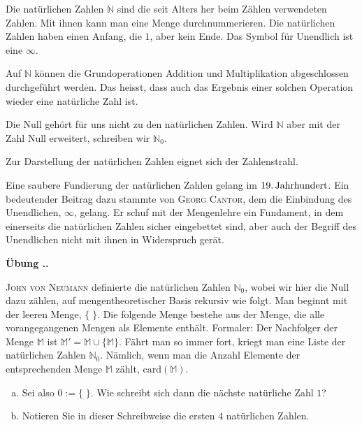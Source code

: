 \documentclass[%
11pt,%
twoside,%
titlepage,%
swissgerman,%
headsepline%
]{scrartcl}
\newcommand{\faEyeLightGray}{\textcolor{lightgray}{\faEye}} %
\newcommand{\definition}[1]{\colorbox{emerald}{#1}}
\theoremstyle{definition}
\theoremstyle{plain}
\newcommand{\concatueb}[1]{ueb:#1}%
\newcommand{\concatlsg}[1]{lsg:#1}%
\newcounter{uebcounter}[section]
\renewcommand{\theuebcounter}{\thesection.\arabic{uebcounter}}  %
\newenvironment{uebenv}[1]{%
    \refstepcounter{uebcounter}
    \par\noindent\textbf{Übung \theuebcounter.}%
    \label{\concatueb{#1}}\hfill\hyperref[\concatlsg{#1}]{\faEyeLightGray}\par
}{%
    \par
}
\begin{document}
Die natürlichen Zahlen $\mathbb{N}$ sind die seit Alters her beim Zählen verwendeten Zahlen.
Mit ihnen kann man eine Menge durchnummerieren. Die natürlichen Zahlen haben einen Anfang, die $1$, aber kein Ende. Das Symbol für Unendlich ist eine $\infty$.

Auf $\mathbb{N}$ können die Grundoperationen Addition und Multiplikation \definition{abgeschlossen} durchgeführt werden. Das heisst, dass auch das Ergebnis einer solchen Operation wieder eine natürliche Zahl ist.

Die Null gehört für uns nicht zu den natürlichen Zahlen. Wird $\mathbb{N}$ aber mit der Zahl Null erweitert, schreiben wir $\mathbb{N}_0$.

Zur Darstellung der natürlichen Zahlen eignet sich der \definition{Zahlenstrahl}.

\begin{center}
\end{center}

Eine saubere Fundierung der natürlichen Zahlen gelang im $\unit[19.]{Jahrhundert}$. Ein bedeutender Beitrag dazu stammte von \textsc{Georg Cantor}, dem die Einbindung des Unendlichen, $\infty$, gelang.
Er schuf mit der Mengenlehre ein Fundament, in dem einerseits die natürlichen Zahlen sicher eingebettet sind, aber auch der Begriff des Unendlichen nicht mit ihnen in  Widerspruch gerät.

\begin{uebenv}{johnvonneumann}
    \textsc{John von Neu\-mann} definierte die natürlichen Zahlen $\mathbb{N}_0$, wobei wir hier die Null dazu zählen, auf mengen\-theo\-re\-tischer Basis rekursiv wie folgt. Man be\-ginnt mit der leeren Menge, $\{\;\}$. Die folgende Menge bestehe aus der Menge, die alle vorangegangenen Mengen als Elemente enthält. Formaler: Der Nachfolger der Menge $\mathbb{M}$ ist $\mathbb{M}'=\mathbb{M}\cup\{\mathbb{M}\}$. Fährt man so immer fort, kriegt man eine Liste der natürlichen Zahlen $\mathbb{N}_0$. Nämlich, wenn man die Anzahl Elemente der entsprechenden Menge $\mathbb{M}$ zählt, $\text{card}(\mathbb{M})$.

    \begin{enumerate}[a)]
        \item Sei also $0:=\{\;\}$. Wie schreibt sich dann die nächste natürliche Zahl $1$?
        \item Notieren Sie in dieser Schreibweise die ersten $4$ natürlichen Zahlen.
    \end{enumerate}
\end{uebenv}
\end{document}
